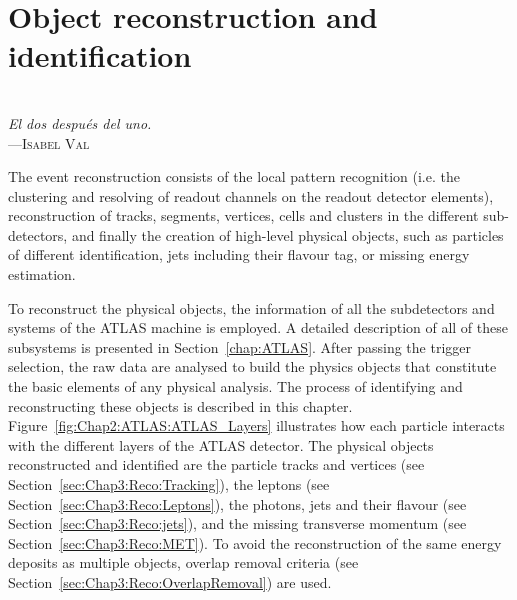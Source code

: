 \begin{comment}
%
%
asdf
\end{comment}




\chapter{Object reconstruction and identification}

\label{chap:ObjectReconstruction}

\vspace*{0.1 cm} 
\hspace*{200pt} \\
\hspace*{175pt} \textit{El dos después del uno.} \\
\hspace*{175pt} ---\textsc{Isabel Val}\\%
\vspace*{2cm} 


The event reconstruction consists of the local pattern recognition (i.e. the
clustering and resolving of readout channels on the readout detector
elements), reconstruction of tracks, segments, vertices, cells and clusters in the
different sub-detectors, and finally the creation of high-level physical objects, such as
particles of different identification, jets including their flavour tag, or missing
energy estimation.

To reconstruct the physical objects, the information of all the subdetectors and systems of the ATLAS machine is employed.
A detailed description of all of these subsystems is presented in Section~\ref{chap:ATLAS}. 
After passing the trigger selection, the raw data are analysed to build the physics objects that constitute the
basic elements of any physical analysis. The process of  identifying and reconstructing these objects is described in this chapter.
Figure~\ref{fig:Chap2:ATLAS:ATLAS_Layers} illustrates how each particle interacts with the different layers of 
the ATLAS detector. 
The physical objects reconstructed and identified are the particle tracks and vertices (see Section~\ref{sec:Chap3:Reco:Tracking}), 
the leptons (see Section~\ref{sec:Chap3:Reco:Leptons}), the photons, jets and their flavour 
(see Section~\ref{sec:Chap3:Reco:jets}),
and the missing transverse momentum (see Section~\ref{sec:Chap3:Reco:MET}).
To avoid the reconstruction of the same energy deposits as multiple objects, overlap
removal criteria (see Section~\ref{sec:Chap3:Reco:OverlapRemoval}) are used.

